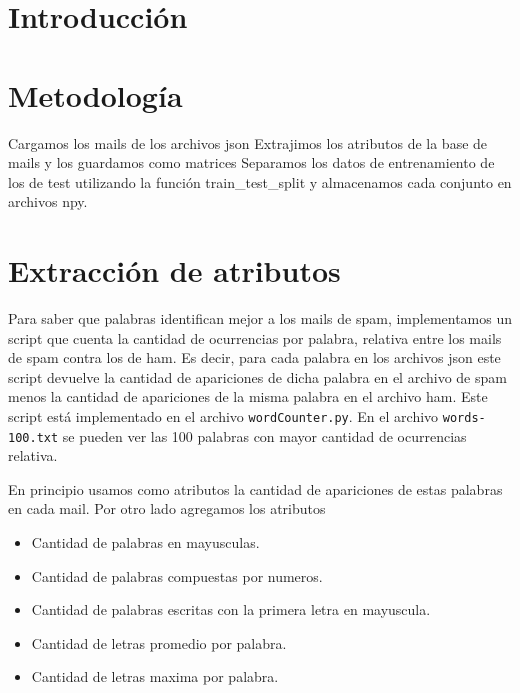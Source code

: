 \documentclass[10pt, a4paper]{article}
\begin{document}
\fecha{\today}



\maketitle
\tableofcontents
\newpage

\section*{Introducción}

\section{Metodología}
Cargamos los mails de los archivos json
Extrajimos los atributos de la base de mails y los guardamos como matrices
Separamos los datos de entrenamiento de los de test utilizando la función train\_test\_split y almacenamos cada conjunto en archivos npy.

\section{Extracción de atributos}
Para saber que palabras identifican mejor a los mails de spam, implementamos un script que cuenta la cantidad de ocurrencias por palabra, relativa entre los mails de spam contra los de ham.
Es decir, para cada palabra en los archivos json este script devuelve la cantidad de apariciones de dicha palabra en el archivo de spam menos la cantidad de apariciones de la misma palabra en el archivo ham.
Este script está implementado en el archivo \texttt{wordCounter.py}. En el archivo \texttt{words-100.txt} se pueden ver las 100 palabras con mayor cantidad de ocurrencias relativa.

En principio usamos como atributos la cantidad de apariciones de estas palabras en cada mail. Por otro lado agregamos los atributos

\begin{itemize}
\item Cantidad de palabras en mayusculas.
\item Cantidad de palabras compuestas por numeros.
\item Cantidad de palabras escritas con la primera letra en mayuscula.
\item Cantidad de letras promedio por palabra.
\item Cantidad de letras maxima por palabra.
\end{itemize}
\end{document}
